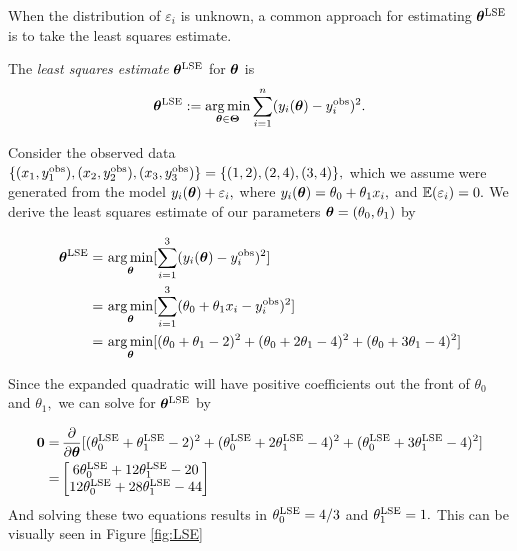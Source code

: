 When the distribution of $\varepsilon_i$ is unknown, a common approach for
estimating $\bm{\theta}^{\mathrm{LSE}}$ is to take the least squares estimate.

\begin{definition}
    The \emph{least squares estimate} $\bm{\theta}^{\mathrm{LSE}}$ for
    $\bm{\theta}$ is
    $$
        \bm{\theta}^{\mathrm{LSE}}
        := \operatorname*{arg\,min}_{\bm{\theta}\in\mathbf{\Theta}}
        \sum_{i = 1}^n (y_i(\bm{\theta})- y_i^{\mathrm{obs}})^2.
    $$
\end{definition}

\begin{example}\label{ex:LSE}
    Consider the observed data
    $\{(x_1, y_1^{\mathrm{obs}}), (x_2, y_2^{\mathrm{obs}}), (x_3, y_3^{\mathrm{obs}})\}
        = \{(1, 2), (2, 4), (3, 4)\},$
    which we assume were generated from the model
    $y_i(\bm{\theta}) + \varepsilon_i,$ where
    $y_i(\bm{\theta}) = \theta_0 + \theta_1x_i,$ and
    $\operatorname{\mathbb{E}}(\varepsilon_i) = 0.$ We derive the least squares estimate of our
    parameters $\bm{\theta} = (\theta_0, \theta_1)$ by

    \begin{align*}
        \bm{\theta}^{\mathrm{LSE}}
        = & \, \operatorname*{arg\,min}_{\bm{\theta}}
        [\sum_{i = 1}^3 (y_i(\bm{\theta}) - y_i^{\mathrm{obs}})^2]           \\
        = & \, \operatorname*{arg\,min}_{\bm{\theta}}
        [\sum_{i = 1}^3 (\theta_0 + \theta_1x_i - y_i^{\mathrm{obs}})^2] \\
        = & \, \operatorname*{arg\,min}_{\bm{\theta}}
        [(\theta_0 + \theta_1 - 2)^2 + (\theta_0 + 2\theta_1 - 4)^2
            + (\theta_0 + 3\theta_1 - 4)^2]
    \end{align*}

    Since the expanded quadratic will have positive coefficients out the front
    of $\theta_0$ and $\theta_1,$ we can solve for $\bm{\theta}^{\mathrm{LSE}}$
    by

    \begin{align*}
        \mathbf{0}
        = & \, \frac{\partial}{\partial \bm{\theta}}
        [
            (\theta^{\mathrm{LSE}}_0 + \theta^{\mathrm{LSE}}_1 - 2)^2
            + (\theta^{\mathrm{LSE}}_0 + 2\theta^{\mathrm{LSE}}_1 - 4)^2
            + (\theta^{\mathrm{LSE}}_0 + 3\theta^{\mathrm{LSE}}_1 - 4)^2
        ]                                        \\
        = & \begin{bmatrix}
                6\theta^{\mathrm{LSE}}_0 + 12\theta^{\mathrm{LSE}}_1 - 20 \\
                12\theta^{\mathrm{LSE}}_0 + 28\theta^{\mathrm{LSE}}_1 - 44
            \end{bmatrix}
    \end{align*}
    And solving these two equations results in $\theta^{\mathrm{LSE}}_0 = 4/3$ and
    $\theta^{\mathrm{LSE}}_1 = 1.$ This can be visually seen in Figure \ref{fig:LSE}
\end{example}


